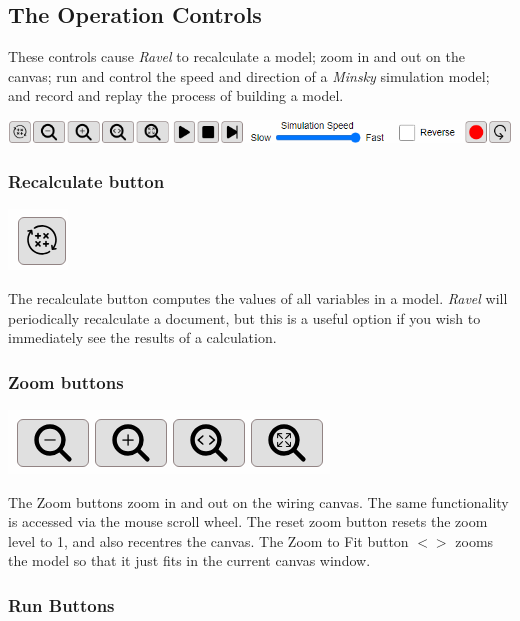 \subsection{The Operation Controls}

These controls cause \emph{Ravel} to recalculate a model; zoom in
and out on the canvas; run and control the speed and direction of
a \emph{Minsky} simulation model; and record and replay the process
of building a model.

\includegraphics[width=15cm]{images/OperationsControls}

\subsubsection{Recalculate button}

\includegraphics{images/Recalc}

The recalculate button computes the values of all variables in a model.
\emph{Ravel} will periodically recalculate a document, but this is
a useful option if you wish to immediately see the results of a calculation.

\subsubsection{Zoom buttons}

\label{ZoomButtons}

\includegraphics{images/ZoomControls}

The Zoom buttons zoom in and out on the wiring canvas. The same functionality
is accessed via the mouse scroll wheel. The reset zoom button 
resets the zoom level to 1, and also recentres the canvas. The Zoom
to Fit button $<>$ zooms the model so that it just fits in the current
canvas window.

\subsubsection{Run Buttons}

